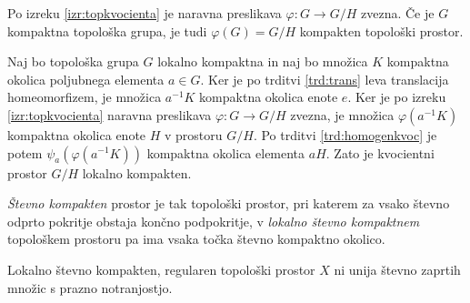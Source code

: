 \documentclass[mat1]{fmfdelo}
\begin{document}
\begin{dokaz}
Po izreku \ref{izr:topkvocienta} je naravna preslikava $\varphi\colon G \to G/H$ zvezna. Če je $G$ kompaktna topološka grupa, je tudi $\varphi(G) = G/H$ kompakten topološki prostor.

Naj bo topološka grupa $G$ lokalno kompaktna in naj bo množica $K$ kompaktna okolica poljubnega elementa $a \in G$. Ker je po trditvi \ref{trd:trans} leva translacija homeomorfizem, je množica $a^{-1}K$ kompaktna okolica enote $e$. Ker je po izreku \ref{izr:topkvocienta} naravna preslikava $\varphi\colon G \to G/H$ zvezna, je množica $\varphi(a^{-1}K)$ kompaktna okolica enote $H$ v prostoru $G/H$. Po trditvi \ref{trd:homogenkvoc} je potem $\psi_a(\varphi(a^{-1}K))$ kompaktna okolica elementa $aH$. Zato je kvocientni prostor $G/H$ lokalno kompakten.
\end{dokaz}

\begin{definicija}
\emph{Števno kompakten} prostor je tak topološki prostor, pri katerem za vsako števno odprto pokritje obstaja končno podpokritje, v \emph{lokalno števno kompaktnem} topološkem prostoru pa ima vsaka točka števno kompaktno okolico. 
\end{definicija}

\begin{trditev}\label{trd:kompni}
Lokalno števno kompakten, regularen topološki prostor $X$ ni unija števno zaprtih množic s prazno notranjostjo.
\end{trditev}
\end{document}
